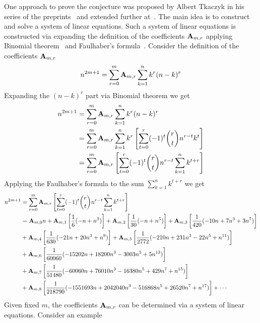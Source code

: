 One approach to prove the conjecture was proposed by Albert Tkaczyk
in his series of the preprints~\cite{tkaczyk2018problem, tkaczyk2018continuation}
and extended further at~\cite{kolosov2022106}.
The main idea is to construct and solve a system of linear equations.
Such a system of linear equations is constructed
via expanding the definition of the coefficients ${\mathbf{A}} \sb{m,r}$
applying Binomial theorem~\cite{abramowitz1988handbook} and Faulhaber's formula~\cite{beardon1996sums}.
Consider the definition of the coefficients ${\mathbf{A}} \sb{m,r}$
\begin{equation}
    n^{2m+1} = \sum_{r=0}^{m} {\mathbf{A}} \sb{m,r} \sum_{k=1}^{n} k^{r} (n-k)^{r}\label{eq:odd-power-identity}
\end{equation}
Expanding the $(n-k)^r$ part via Binomial theorem we get
\begin{equation}
    \begin{split}
        n^{2m+1} &= \sum_{r=0}^{m} {\mathbf{A}} \sb{m,r} \sum_{k=1}^{n} k^{r} (n-k)^{r} \\
        &= \sum_{r=0}^{m} {\mathbf{A}} \sb{m,r} \sum_{k=1}^{n} k^{r} \left[ \sum_{t=0}^{r} (-1)^t \binom{r}{t} n^{r-t} k^{t} \right] \\
        &= \sum_{r=0}^{m} {\mathbf{A}} \sb{m,r} \left[ \sum_{t=0}^{r} (-1)^t \binom{r}{t} n^{r-t} \sum_{k=1}^{n} k^{t+r} \right] \\
    \end{split}\label{eq:equation2}
\end{equation}
Applying the Faulhaber's formula to the sum $\sum_{k=1}^{n} k^{t+r}$ we get
\begin{equation}
    \begin{split}
        n^{2m+1}
        &= \sum_{r=0}^{m} {\mathbf{A}} \sb{m,r} \left[ \sum_{t=0}^{r} (-1)^t \binom{r}{t} n^{r-t} \sum_{k=1}^{n} k^{t+r} \right] \\
        &= {\mathbf{A}} \sb{m,0} n
        + {\mathbf{A}} \sb{m,1} \left[ \frac{1}{6} (-n + n^3) \right]
        + {\mathbf{A}} \sb{m,2} \left[ \frac{1}{30} (-n + n^5) \right]
        + {\mathbf{A}} \sb{m,3} \left[ \frac{1}{420} (-10 n + 7 n^3 + 3 n^7) \right] \\
        &+ {\mathbf{A}} \sb{m,4} \left[ \frac{1}{630} (-21 n + 20 n^3 + n^9) \right]
        + {\mathbf{A}} \sb{m,5} \left[ \frac{1}{2772} (-210 n + 231 n^3 - 22 n^5 + n^{11}) \right] \\
        &+ {\mathbf{A}} \sb{m,6} \left[ \frac{1}{60060} (-15202 n + 18200 n^3 - 3003 n^5 + 5 n^{13}) \right] \\
        &+ {\mathbf{A}} \sb{m,7} \left[ \frac{1}{51480} (-60060 n + 76010 n^3 - 16380 n^5 + 429 n^7 + n^{15}) \right] \\
        &+ {\mathbf{A}} \sb{m,8} \left[ \frac{1}{218790} (-1551693 n + 2042040 n^3 - 516868 n^5 + 26520 n^7 + n^{17}) \right] + \cdots
    \end{split}\label{eq:equation17}
\end{equation}
Given fixed $m$, the coefficients ${\mathbf{A}} \sb{m,r}$ can be determined via a system of linear equations.
Consider an example